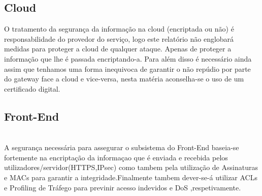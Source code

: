 \subsection{Cloud}
\par\hfill
\par O tratamento da segurança da informação na cloud (encriptada ou não) é responsabilidade do provedor do serviço, logo este relatório não englobará medidas para proteger a cloud de qualquer ataque. Apenas de proteger a informação que lhe é passada encriptando-a.\newline
Para além disso é necessário ainda assim que tenhamos uma forma inequivoca de garantir o não repúdio por parte do gateway face a cloud e vice-versa, nesta matéria aconselha-se o uso de um certificado digital.\newline 

\subsection{Front-End}
\hfill\\

A segurança necessária para assegurar o subsistema do Front-End baseia-se fortemente na encriptação da informaçao que é enviada e recebida pelos utilizadores/servidor(HTTPS,IPsec) como tambem pela utilização de Assinaturas e MACs para garantir a integridade.Finalmente tambem dever-se-á utilizar ACLs e Profiling de Tráfego para previnir acesso indevidos e DoS ,respetivamente.

